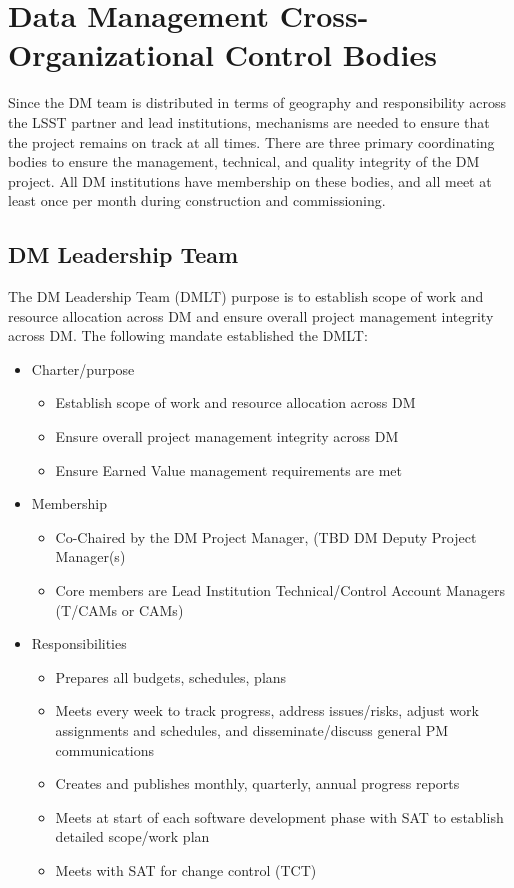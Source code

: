 \section{Data Management Cross-Organizational Control Bodies}
Since the DM team is distributed in terms of geography and responsibility across the LSST partner and lead institutions, mechanisms are needed to ensure that the project remains on track at all times.  There are three primary coordinating bodies to ensure the management, technical, and quality integrity of the DM project.  All DM institutions have membership on these bodies, and all meet at least once per month during construction and commissioning.
\subsection{DM Leadership Team}

The DM Leadership Team (DMLT) purpose is to establish scope of work and resource allocation across DM and ensure overall project management integrity across DM.
The following mandate established the DMLT:

\begin{itemize}
\item Charter/purpose
\begin{itemize}
\item Establish scope of work and resource allocation across DM
\item Ensure overall project management integrity across DM
\item Ensure Earned Value management requirements are met
\end{itemize}
\item Membership
\begin{itemize}
\item Co-Chaired by the DM Project Manager, (TBD DM Deputy Project Manager(s)
\item Core members are Lead Institution Technical/Control Account Managers (T/CAMs or CAMs)
\end{itemize}
\item Responsibilities
\begin{itemize}
\item Prepares all budgets, schedules, plans
\item Meets every week to track progress, address issues/risks, adjust work assignments and schedules, and disseminate/discuss general PM communications
\item Creates and publishes monthly, quarterly, annual progress reports
\item Meets at start of each software development phase with SAT to establish detailed scope/work plan
\item Meets with SAT for change control (TCT)
\end{itemize}
\end{itemize}

